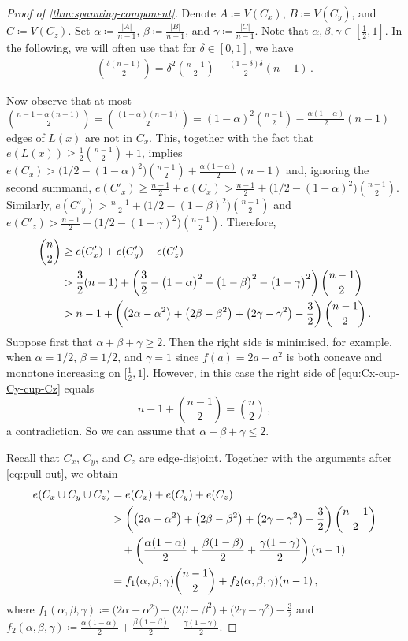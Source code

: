 \documentclass[12pt,reqno]{amsart}
\theoremstyle{plain}
\theoremstyle{definition}
\numberwithin{equation}{section}
\newcommand{\al}{\alpha}
\newcommand{\be}{\beta}
\newcommand{\ce}{\gamma}
\newcommand{\abs}[1]{\left\lvert#1\right\rvert}
\begin{document}
\begin{proof}[Proof of \cref{thm:spanning-component}]
		Denote $A \coloneq V(C_x)$, $B\coloneq V(C_y)$, and $C \coloneq V(C_z)$.
		Set $\al \coloneq\frac{\abs A}{n-1}$, $\be\coloneq\frac{\abs B}{n-1}$, and $\ce\coloneq\frac{\abs C}{n-1}$. Note that $\al,\be,\ce\in[\frac12,1]$. In the following, we will often use that for $\delta\in[0,1]$, we have
		\begin{align}\label{eq:pull out}
			\binom{\delta(n-1)}{2}=\delta^2\binom{n-1}{2}-\frac{(1-\delta)\delta}{2}(n-1) \,.
		\end{align}
		
		Now observe that at most $\binom{n-1-\al(n-1)}{2} =\binom{(1-\al)(n-1)}{2}= (1-\alpha)^2\binom{n-1}{2}-\frac{\alpha(1-\alpha)}2(n-1)$ edges of $L(x)$ are not in $C_x$.
		This, together with the fact that $e(L(x))\ge \frac{1}{2}\binom{n-1}{2}+1$, implies $e(C_x) > \big(1/2 - (1-\al)^2\big)\binom{n-1}{2}+\frac{\alpha(1-\alpha)}2(n-1)$ and, ignoring the second summand,  $e(C'_x)\ge \frac{n-1}{2}+e(C_x)>\frac{n-1}{2}+ \big(1/2 - (1-\al)^2\big)\binom{n-1}{2}$. Similarly, $e(C'_y)>\frac{n-1}{2}+ \big(1/2 - (1-\be)^2\big)\binom{n-1}{2}$ and $e(C'_z)>\frac{n-1}{2}+ \big(1/2 - (1-\ce)^2\big)\binom{n-1}{2}$.
		Therefore,
		\begin{align}
			\binom n2 &\ge e(C_x')+e(C_y')+e(C_z')\notag\\&>\frac{3}{2}(n-1)+\left(\frac{3}{2}-\big(1-\al\big)^2-\big(1-\be\big)^2-\big(1-\ce\big)^2\right)\binom{n-1}{2}\notag\\\label{equ:Cx-cup-Cy-cup-Cz}
			&>n-1+\left(\big(2\al-\al^2\big)+\big(2\be-\be^2\big)+\big(2\ce-\ce^2\big)-\frac{3}{2}\right)\binom{n-1}{2}\,.
		\end{align}
		Suppose first that $\al+\be+\ce\geq 2$.
		Then the right side is minimised, for example, when $\al=1/2$, $\be=1/2$, and $\ce=1$ since $f(a)=2a-a^2$ is both concave and monotone increasing on $\big[\frac{1}{2},1\big]$. However, in this case the right side of \eqref{equ:Cx-cup-Cy-cup-Cz} equals 
		\[n-1+\binom{n-1}{2}=\binom{n}{2}\,,\]
		a contradiction. So we can assume that $\al+\be+\ce\leq 2$.
		
		Recall that $C_x$, $C_y$, and $C_z$ are edge-disjoint.
		Together with the arguments after \eqref{eq:pull out}, we obtain
		\begin{align}
			\label{equ:Cx-cup-Cy-cup-Cz-noprime}
			e(C_x \cup C_y \cup C_z) &= e(C_x)+e(C_y)+e(C_z) \notag \\&> \left(\big(2\al-\al^2\big)+\big(2\be-\be^2\big)+\big(2\ce-\ce^2\big)-\frac{3}{2}\right)\binom{n-1}{2}\notag\\
			&\quad+\left(\frac{\alpha(1-\alpha)}{2}+\frac{\beta(1-\beta)}{2}+\frac{\gamma(1-\gamma)}{2}\right)(n-1)\notag\\
			&=f_1(\alpha,\beta,\gamma)\binom{n-1}{2}+f_2(\alpha,\beta,\gamma)(n-1)\,,
		\end{align}
		where $f_1(\alpha,\beta,\gamma)\coloneq \big(2\al-\al^2\big)+\big(2\be-\be^2\big)+\big(2\ce-\ce^2\big)-\frac{3}{2}$ and $f_2(\alpha,\beta,\gamma)\coloneq \frac{\alpha(1-\alpha)}{2}+\frac{\beta(1-\beta)}{2}+\frac{\gamma(1-\gamma)}{2}$.
		

\end{proof}
\end{document}
